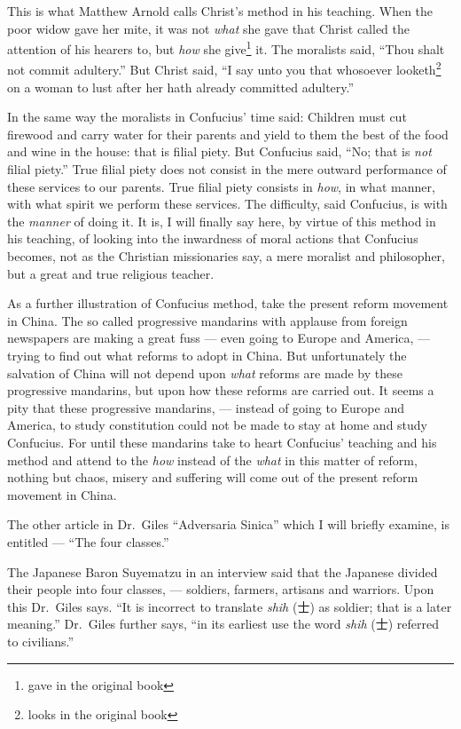 This is what Matthew Arnold calls Christ's method in his teaching.
When the poor widow gave her mite, it was not \emph{what} she gave that Christ called the attention of his hearers to, but \emph{how} she give\footnote{gave in the original book} it.
The moralists said, ``Thou shalt not commit adultery.''
But Christ said, ``I say unto you that whosoever looketh\footnote{looks in the original book} on a woman to lust after her hath already committed adultery.''

In the same way the moralists in Confucius' time said: Children must cut firewood and carry water for their parents and yield to them the best of the food and wine in the house: that is filial piety.
But Confucius said, ``No; that is \emph{not} filial piety.''
True filial piety does not consist in the mere outward performance of these services to our parents.
True filial piety consists in \emph{how}, in what manner, with what spirit we perform these services.
The difficulty, said Confucius, is with the \emph{manner} of doing it.
It is, I will finally say here, by virtue of this method in his teaching, of looking into the inwardness of moral actions that Confucius becomes, not as the Christian missionaries say, a mere moralist and philosopher, but a great and true religious teacher.

As a further illustration of Confucius method, take the present reform movement in China.
The so called progressive mandarins with applause from foreign newspapers are making a great fuss --- even going to Europe and America, --- trying to find out what reforms to adopt in China.
But unfortunately the salvation of China will not depend upon \emph{what} reforms are made by these progressive mandarins, but upon how these reforms are carried out.
It seems a pity that these progressive mandarins, --- instead of going to Europe and America, to study constitution could not be made to stay at home and study Confucius.
For until these mandarins take to heart Confucius' teaching and his method and attend to the \emph{how} instead of the \emph{what} in this matter of reform, nothing but chaos, misery and suffering will come out of the present reform movement in China.

The other article in Dr.~Giles ``Adversaria Sinica'' which I will briefly examine, is entitled --- ``The four classes.''

The Japanese Baron Suyematzu in an interview said that the Japanese divided their people into four classes, --- soldiers, farmers, artisans and warriors.
Upon this Dr.~Giles says. ``It is incorrect to translate \emph{shih} (士) as soldier; that is a later meaning.''
Dr.~Giles further says, ``in its earliest use the word \emph{shih} (士) referred to civilians.''

